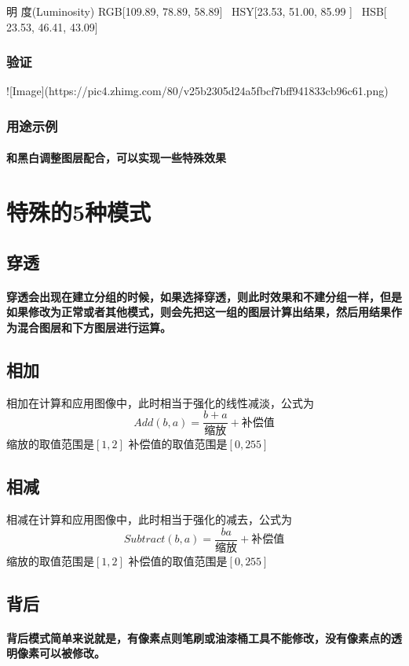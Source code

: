明    度(Luminosity)    RGB[109.89,  78.89,  58.89]~ HSY[23.53,  51.00,  85.99 ]~ HSB[ 23.53,  46.41,  43.09]

\subsubsection{ 验证}
![Image](https://pic4.zhimg.com/80/v25b2305d24a5fbcf7bff941833cb96c61.png)
\subsubsection{ 用途示例}
\paragraph{和黑白调整图层配合，可以实现一些特殊效果}
\section{特殊的5种模式}
\subsection{ 穿透}
\paragraph{穿透会出现在建立分组的时候，如果选择穿透，则此时效果和不建分组一样，但是如果修改为正常或者其他模式，则会先把这一组的图层计算出结果，然后用结果作为混合图层和下方图层进行运算。}
\subsection{ 相加}
相加在计算和应用图像中，此时相当于强化的线性减淡，公式为
$$Add(b,a)= \dfrac{b+a}{缩放}+补偿值$$
缩放的取值范围是$[1,2]$
补偿值的取值范围是$[0,255]$
\subsection{ 相减}
相减在计算和应用图像中，此时相当于强化的减去，公式为
$$Subtract(b,a)= \dfrac{ba}{缩放}+补偿值$$
缩放的取值范围是$[1,2]$
补偿值的取值范围是$[0,255]$
\subsection{ 背后}
\paragraph{背后模式简单来说就是，有像素点则笔刷或油漆桶工具不能修改，没有像素点的透明像素可以被修改。}

